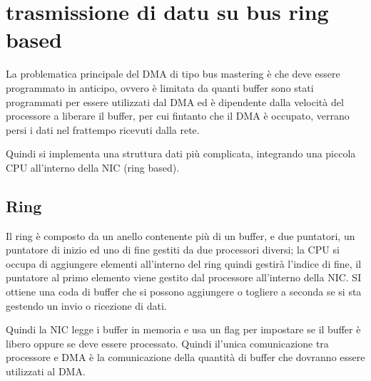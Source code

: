 \section{trasmissione di datu su bus ring based}
La problematica principale del DMA di tipo bus mastering è che deve essere
programmato in anticipo, ovvero è limitata da quanti buffer sono stati programmati
per essere utilizzati dal DMA ed è dipendente dalla velocità del processore a
liberare il buffer, per cui fintanto che il DMA è occupato, verrano persi i
dati nel frattempo ricevuti dalla rete.


Quindi si implementa una struttura dati più complicata, integrando una piccola
CPU all'interno della NIC (ring based).
\subsection{Ring}
Il ring è composto da un anello contenente più di un buffer, e due puntatori,
un puntatore di inizio ed uno di fine gestiti da due processori diversi;
la CPU si occupa di aggiungere elementi all'interno del ring quindi gestirà
l'indice di fine, il puntatore al primo elemento viene gestito dal processore
all'interno della NIC.
SI ottiene una coda di buffer che si possono aggiungere o togliere a seconda
se si sta gestendo un invio o ricezione di dati.

Quindi la NIC legge i buffer in memoria e usa un flag per impostare se il buffer
è libero oppure se deve essere processato.
Quindi il'unica comunicazione tra processore e DMA è la comunicazione della 
quantità di buffer che dovranno essere utilizzati al DMA.
